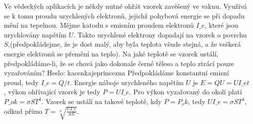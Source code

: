 Ve vědeckých aplikacích je někdy nutné ohřát vzorek zavěšený ve vakuu. Využívá se k tomu proudu urychlených elektronů, jejichž pohybová energie se při dopadu mění na tepelnou. Mějme katodu s emisním proudem elektronů $I\_e$, které jsou urychlovány napětím $U$. Takto urychlené elektrony dopadají na vzorek o povrchu $S$,(předpokládejme, že je dost malý, aby byla teplota všude stejná, a že veškerá energie elektronů se přemění na teplo). Na jaké teplotě se vzorek ustálí, předpokládáme-li, že se chová jako dokonale černé těleso a teplo ztrácí pouze vyzařováním?                                 Heslo: kacenkajeprincezna
Předpokládáme konstantní emisní proud, tedy $I\_e=Q/t$. Energie náboje urychleného napětím $U$ je $E=QU=UI\_et$, výkon ohřívající vzorek je tedy $P=UI\_e$. Pro výkon vyzařovaný do okolí platí $P\_{ok}=\sigma ST^4$. Vzorek se ustálí na takové teplotě, kdy $P=P_ok$, tedy $UI\_e=\sigma ST^4$, odkud přímo $T=\sqrt[4]{\frac{UI\_e}{\sigma S}}$. 